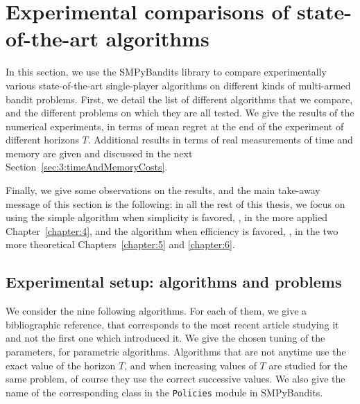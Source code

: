 \section{Experimental comparisons of state-of-the-art algorithms}
\label{sec:3:reviewSPAlgorithms}


In this section, we use the SMPyBandits library to compare experimentally various state-of-the-art single-player algorithms on different kinds of multi-armed bandit problems.
First, we detail the list of different algorithms that we compare, and the different problems on which they are all tested.
We give the results of the numerical experiments, in terms of mean regret at the end of the experiment of different horizons $T$.
Additional results in terms of real measurements of time and memory are given and discussed in the next Section~\ref{sec:3:timeAndMemoryCosts}.

Finally, we give some observations on the results, and the main take-away message of this section is the following: in all the rest of this thesis, we focus on using the simple \UCB{} algorithm when simplicity is favored, \ie, in the more applied Chapter~\ref{chapter:4}, and the \klUCB{} algorithm when efficiency is favored, \ie, in the two more theoretical Chapters~\ref{chapter:5} and \ref{chapter:6}.


\subsection{Experimental setup: algorithms and problems}


We consider the nine following algorithms. For each of them, we give a bibliographic reference, that corresponds to the most recent article studying it and not the first one which introduced it.
We give the chosen tuning of the parameters, for parametric algorithms.
Algorithms that are not anytime use the exact value of the horizon $T$, and when increasing values of $T$ are studied for the same problem, of course they use the correct successive values.
We also give the name of the corresponding class in the \texttt{Policies} module in SMPyBandits.

